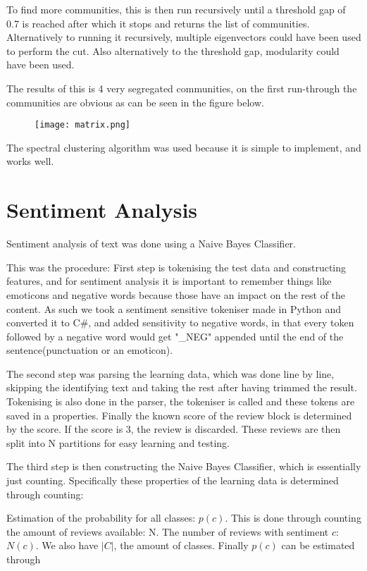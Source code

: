 	To find more communities, this is then run recursively until a threshold gap of 0.7 is reached after which it stops and returns the list of communities. Alternatively to running it recursively, multiple eigenvectors could have been used to perform the cut. Also alternatively to the threshold gap, modularity could have been used.
	
	The results of this is 4 very segregated communities, on the first run-through the communities are obvious as can be seen in the figure below.
	
	\begin{figure}[H]
	\texttt{[image: matrix.png]}
	\end{figure}
	
	The spectral clustering algorithm was used because it is simple to implement, and works well.
	
	\section{Sentiment Analysis}
	Sentiment analysis of text was done using a Naive Bayes Classifier.
	
	This was the procedure:
	First step is tokenising the test data and constructing features, and for sentiment analysis it is important to remember things like emoticons and negative words because those have an impact on the rest of the content. As such we took a sentiment sensitive tokeniser made in Python and converted it to C\#, and added sensitivity to negative words, in that every token followed by a negative word would get "\_NEG" appended until the end of the sentence(punctuation or an emoticon).
	
	The second step was parsing the learning data, which was done line by line, skipping the identifying text and taking the rest after having trimmed the result. Tokenising is also done in the parser, the tokeniser is called and these tokens are saved in a properties. Finally the known score of the review block is determined by the score. If the score is 3, the review is discarded. These reviews are then split into N partitions for easy learning and testing.
	
	The third step is then constructing the Naive Bayes Classifier, which is essentially just counting. Specifically these properties of the learning data is determined through counting:
	
	Estimation of the probability for all classes: $p(c)$. This is done through counting the amount of reviews available: N. The number of reviews with sentiment $c$: $N(c)$. We also have $|C|$, the amount of classes. Finally $p(c)$ can be estimated through
	

